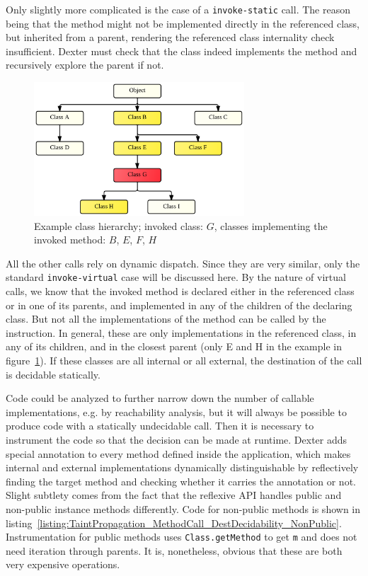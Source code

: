 \documentclass[12pt,twoside,notitlepage]{report}
\begin{document}
Only slightly more complicated is the case of a \verb$invoke-static$ call. The reason being that the method might not be implemented directly in the referenced class, but inherited from a parent, rendering the referenced class internality check insufficient. Dexter must check that the class indeed implements the method and recursively explore the parent if not.

\begin{figure}
	\centerline{	
		\includegraphics[width=0.7\textwidth]{figs/fig_virtual_call_tree.png}
	}
	\caption{Example class hierarchy; invoked class: $G$, classes implementing the invoked method: $B$, $E$, $F$, $H$}
	\label{fig:TaintPropagation_DestDecision_ClassHierarchy}
\end{figure}

All the other calls rely on dynamic dispatch. Since they are very similar, only the standard \verb$invoke-virtual$ case will be discussed here. By the nature of virtual calls, we know that the invoked method is declared either in the referenced class or in one of its parents, and implemented in any of the children of the declaring class. But not all the implementations of the method can be called by the instruction. In general, these are only implementations in the referenced class, in any of its children, and in the closest parent (only E and H in the example in figure~\ref{fig:TaintPropagation_DestDecision_ClassHierarchy}). If these classes are all internal or all external, the destination of the call is decidable statically. 

Code could be analyzed to further narrow down the number of callable implementations, e.g. by reachability analysis, but it will always be possible to produce code with a statically undecidable call. Then it is necessary to instrument the code so that the decision can be made at runtime. Dexter adds special annotation to every method defined inside the application, which makes internal and external implementations dynamically distinguishable by reflectively finding the target method and checking whether it carries the annotation or not. Slight subtlety comes from the fact that the reflexive API handles public and non-public instance methods differently. Code for non-public methods is shown in listing~\ref{listing:TaintPropagation_MethodCall_DestDecidability_NonPublic}. Instrumentation for public methods uses \verb$Class.getMethod$ to get \verb$m$ and does not need iteration through parents. It is, nonetheless, obvious that these are both very expensive operations. 
\end{document}
